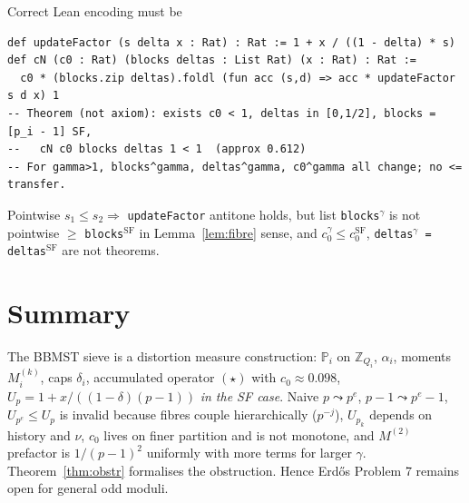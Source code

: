 \documentclass[11pt,a4paper]{article}
\theoremstyle{plain}
\theoremstyle{definition}
\theoremstyle{remark}
\newcommand{\Z}{\mathbb{Z}}
\newcommand{\PP}{\mathbb{P}}
\begin{document}
Correct Lean encoding must be
\begin{verbatim}
def updateFactor (s delta x : Rat) : Rat := 1 + x / ((1 - delta) * s)
def cN (c0 : Rat) (blocks deltas : List Rat) (x : Rat) : Rat :=
  c0 * (blocks.zip deltas).foldl (fun acc (s,d) => acc * updateFactor s d x) 1
-- Theorem (not axiom): exists c0 < 1, deltas in [0,1/2], blocks = [p_i - 1] SF,
--   cN c0 blocks deltas 1 < 1  (approx 0.612)
-- For gamma>1, blocks^gamma, deltas^gamma, c0^gamma all change; no <= transfer.
\end{verbatim}
Pointwise $s_{1}\le s_{2}\Rightarrow$ \texttt{updateFactor} antitone holds, but list \texttt{blocks$^{\gamma}$} is not pointwise $\ge$ \texttt{blocks$^{\mathrm{SF}}$} in Lemma~\ref{lem:fibre} sense, and $c_{0}^{\gamma}\le c_{0}^{\mathrm{SF}}$, \texttt{deltas$^{\gamma}$ = deltas$^{\mathrm{SF}}$} are not theorems.

\section{Summary}

The BBMST sieve is a distortion measure construction: $\PP_{i}$ on $\Z_{Q_{i}}$, $\alpha_{i}$, moments $M_{i}^{(k)}$, caps $\delta_{i}$, accumulated operator $(\star)$ with $c_{0}\approx0.098$, $U_{p}=1+x/((1-\delta)(p-1))$ \emph{in the SF case}. Naive $p\leadsto p^{e}$, $p-1\leadsto p^{e}-1$, $U_{p^{e}}\le U_{p}$ is invalid because fibres couple hierarchically ($p^{-j}$), $U_{p_{k}}$ depends on history and $\nu$, $c_{0}$ lives on finer partition and is not monotone, and $M^{(2)}$ prefactor is $1/(p-1)^{2}$ uniformly with more terms for larger $\gamma$. Theorem~\ref{thm:obstr} formalises the obstruction. Hence Erd\H{o}s Problem 7 remains open for general odd moduli.
\end{document}
